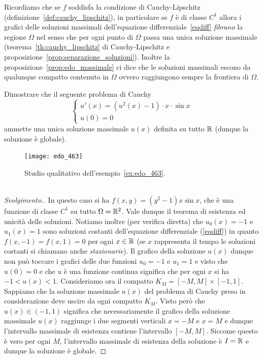 Ricordiamo che se $f$ soddisfa la condizione di Cauchy-Lipschitz
(definizione~\ref{def:cauchy_lipschitz}), in particolare
se $f$ è di classe $C^1$ allora i grafici delle soluzioni
massimali dell'equazione differenziale~\eqref{eqdiff}
\emph{fibrano} la regione $\Omega$ nel senso che per ogni punto di
$\Omega$ passa una unica soluzione massimale (teorema~\ref{th:cauchy_lipschitz}
di Cauchy-Lipschitz e proposizione~\ref{prop:separazione_soluzioni}).
Inoltre la proposizione~\ref{prop:edo_massimale} ci dice
che le soluzioni massimali escono da qualunque compatto contenuto in
$\Omega$ ovvero raggiungono sempre la frontiera di $\Omega$.

\begin{example}\label{ex:edo_463}
Dimostrare che il seguente problema di Cauchy
\[
	\begin{cases}
		u'(x) = (u^2(x)-1)\cdot x\cdot \sin x \\
		u(0) = 0
	\end{cases}
\]
ammette una unica soluzione massimale $u(x)$
definita su tutto ${\mathbb R}$ (dunque la soluzione è globale).
\end{example}
\newsavebox{\qredoquattro}
\begin{figure}
  \centering\texttt{[image: edo\_463]}
  \label{fig:edo_463}
  \caption{Studio qualitativo dell'esempio~\ref{ex:edo_463}.
  \ifwidemargin\\\\\fi%
  \usebox{\qredoquattro}}
\end{figure}
%
\begin{proof}[Svolgimento.]
In questo caso si ha $f(x,y)=(y^2-1)x\sin x$, che \`e una funzione
di classe $C^1$ su tutto $\Omega={\mathbb R}^2$.
Vale dunque il teorema di esistenza ed
unicità delle soluzioni.
Notiamo inoltre (per verifica diretta)
che $u_0(x)=-1$ e $u_1(x)=1$ sono
soluzioni costanti dell'equazione differenziale (\ref{eqdiff})
in quanto $f(x,-1)=f(x,1)=0$ per ogni $x\in {\mathbb R}$
(se $x$ rappresenta il tempo le soluzioni costanti si chiamano
anche \emph{stazionarie}).
Il grafico della soluzione $u(x)$ dunque
non può toccare i grafici delle due funzioni $u_0=-1$ e $u_1=1$ e visto
che $u(0)=0$ e che $u$ è una funzione continua significa
che per ogni $x$ si ha $-1 < u(x) < 1$.
Consideriamo ora il compatto
$K_M=[-M,M] \times [-1,1]$.
Sappiamo che la soluzione
massimale $u(x)$ del problema di Cauchy preso in considerazione deve
uscire da ogni compatto $K_M$.
Visto però che $u(x)\in (-1,1)$ significa che necessariamente
il grafico della soluzione massimale $u(x)$
raggiunge i due segmenti verticali
$x=-M$ e $x=M$ e dunque l'intervallo massimale di esistenza
contiene l'intervallo $[-M,M]$.
Siccome questo è vero per ogni $M$, l'intervallo massimale
di esistenza della soluzione è $I={\mathbb R}$ e dunque la soluzione
è globale.
\end{proof}

